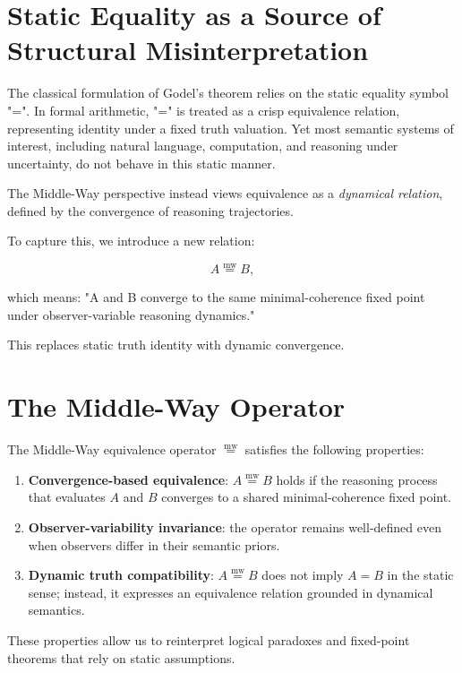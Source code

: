 \documentclass[11pt]{article}
\newcommand{\mweq}{\overset{\mathrm{mw}}{=}}
\begin{document}
\section{Static Equality as a Source of Structural Misinterpretation}

The classical formulation of Godel's theorem relies on the static equality 
symbol "=". In formal arithmetic, "=" is treated as a crisp equivalence 
relation, representing identity under a fixed truth valuation. Yet most 
semantic systems of interest, including natural language, computation, and 
reasoning under uncertainty, do not behave in this static manner.

The Middle-Way perspective instead views equivalence as a \emph{dynamical 
relation}, defined by the convergence of reasoning trajectories.

To capture this, we introduce a new relation:

\begin{equation}
A \mweq B,
\end{equation}

which means: "A and B converge to the same minimal-coherence fixed point 
under observer-variable reasoning dynamics."

This replaces static truth identity with dynamic convergence.

\section{The Middle-Way Operator}

The Middle-Way equivalence operator $\mweq$ satisfies the following 
properties:

\begin{enumerate}
    \item \textbf{Convergence-based equivalence}: $A \mweq B$ holds if 
    the reasoning process that evaluates $A$ and $B$ converges to a shared 
    minimal-coherence fixed point.
    \item \textbf{Observer-variability invariance}: 
    the operator remains well-defined even when observers differ in 
    their semantic priors.
    \item \textbf{Dynamic truth compatibility}: 
    $A \mweq B$ does not imply $A = B$ in the static sense; instead, 
    it expresses an equivalence relation grounded in dynamical semantics.
\end{enumerate}

These properties allow us to reinterpret logical paradoxes and fixed-point 
theorems that rely on static assumptions.
\end{document}
